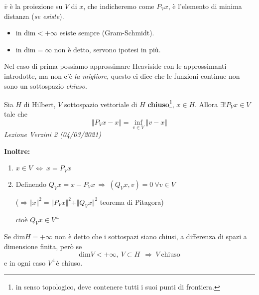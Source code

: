 \documentclass[10pt,a4paper,twoside,openright]{book}
\begin{document}
\FloatBarrier

$\displaystyle \overline{v}$ è la proiezione su $V$ di $x$, che indicheremo come $P_{V} x$, è l'elemento di minima distanza (\textit{se esiste}).
\begin{itemize}
\item in $\mathrm{dim} < +\infty $ esiste sempre (Gram-Schmidt).
\item in $\mathrm{dim} =\infty $ non è detto, servono ipotesi in più.
\end{itemize}

Nel caso di prima possiamo approssimare Heaviside con le approssimanti introdotte, ma non c'è \textit{la migliore}, questo ci dice che le funzioni continue non sono un sottospazio \textit{chiuso}.
\begin{theorem}
 Sia $H$ di Hilbert, $V$ sottospazio vettoriale di $H$ \textbf{chiuso}\footnote{in senso topologico, deve contenere tutti i suoi punti di frontiera.}, $x\in H$. Allora $\exists !P_{V} x\in V$ tale che
\begin{equation*}
\Vert P_{V} x-x\Vert =\inf_{v\in V}\Vert v-x\Vert 
\end{equation*}
\textit{Lezione Verzini 2 (04/03/2021)}

\textbf{Inoltre:}
\begin{enumerate}
\item $\displaystyle x\in V\ \Leftrightarrow \ x=P_{V} x$
\item Definendo $\displaystyle Q_{V} x=x-P_{V} x\ \Rightarrow \ (Q_{V} x,v) =0\ \forall v\in V$

($\displaystyle \Longrightarrow \Vert x\Vert ^{2} =\Vert P_{V} x\Vert ^{2} +\Vert Q_{V} x\Vert ^{2}$ teorema di Pitagora)

cioè $\displaystyle Q_{V} x\in V^{\bot }$
\end{enumerate}
\end{theorem}
\begin{nb}
Se $\displaystyle \mathrm{dim} H\mathrm{=+\infty }$ non è detto che i sottospazi siano chiusi, a differenza di spazi a dimensione finita, però se
\begin{equation*}
\mathrm{dim} V< +\infty,\ V\subset H\ \ \Rightarrow \ V\ \text{chiuso}
\end{equation*}
e in ogni caso $\displaystyle V^{\bot }$è chiuso.
\end{nb}
\end{document}
